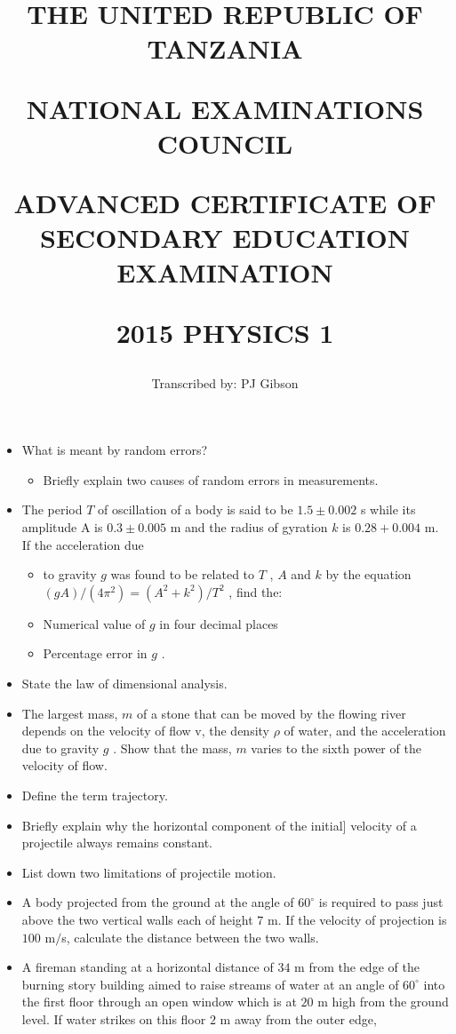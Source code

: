\documentclass{article}
\title{THE UNITED REPUBLIC OF TANZANIA

NATIONAL EXAMINATIONS COUNCIL

ADVANCED CERTIFICATE OF SECONDARY EDUCATION EXAMINATION

\textbf{2015 PHYSICS 1}}
\author{Transcribed by:  PJ Gibson}
\begin{document}
\maketitle

\begin{itemize}
\item What is meant by random errors?
 \begin{itemize}
\item Briefly explain two causes of random errors in measurements. 
\end{itemize}
\item The period $ T$ of oscillation of a body is said to be $ 1.5\pm 0.002$ s while its amplitude A is $ 0.3\pm 0.005$ m and the radius of gyration $ k$ is $ 0.28+0.004$ m. If the acceleration due
 \begin{itemize}
\item to gravity $ g$ was found to be related to $ T$ , $ A$ and $ k$ by the equation $ (gA)/(4\pi^{2})=( A^{2}+k^{2})/T^{2}$ , find the:
\item Numerical value of $ g$ in four decimal places
\item Percentage error in $ g$ .
\end{itemize}
\item State the law of dimensional analysis.
\item The largest mass, $ m$ of a stone that can be moved by the flowing river depends on the velocity of flow v, the density $ \rho $ of water, and the acceleration due to gravity $ g$ . Show that the mass, $ m$ varies to the sixth power of the velocity of flow.
\item Define the term trajectory.
\item Briefly explain why the horizontal component of the initial] velocity of a projectile always remains constant.
\item List down two limitations of projectile motion. 
\item A body projected from the ground at the angle of $ 60^{\circ}$ is required to pass just above the two vertical walls each of height $ 7$ m. If the velocity of projection is $ 100$ m$/$s, calculate the distance between the two walls. 
\item A fireman standing at a horizontal distance of $ 34$ m from the edge of the burning story building aimed to raise streams of water at an angle of $ 60^{\circ}$ into the first floor through an open window which is at $ 20$ m high from the ground level. If water strikes on this floor $ 2$ m away from the outer edge, 

\end{itemize}
\end{document}
